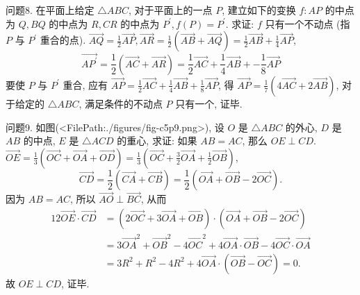 问题8. 在平面上给定 $\triangle A B C$, 对于平面上的一点 $P$, 建立如下的变换 $f: A P$ 的中点为 $Q, B Q$ 的中点为 $R, C R$ 的中点为 $P^{\prime}, f(P)=P^{\prime}$. 求证: $f$ 只有一个不动点 (指 $P$ 与 $P^{\prime}$ 重合的点).
$\overrightarrow{A Q}=\frac{1}{2} \overrightarrow{A P}, \overrightarrow{A R}=\frac{1}{2}(\overrightarrow{A B}+\overrightarrow{A Q})=\frac{1}{2} \overrightarrow{A B}+\frac{1}{4} \overrightarrow{A P}$,
$$
\overrightarrow{A P^{\prime}}=\frac{1}{2}(\overrightarrow{A C}+\overrightarrow{A R})=\frac{1}{2} \overrightarrow{A C}+\frac{1}{4} \overrightarrow{A B}+-\frac{1}{8} \overrightarrow{A P}
$$
要使 $P$ 与 $P^{\prime}$ 重合, 应有 $\overrightarrow{A P}=\frac{1}{2} \overrightarrow{A C}+\frac{1}{4} \overrightarrow{A B}+\frac{1}{8} \overrightarrow{A P}$, 得 $\overrightarrow{A P}=\frac{1}{7}(4 \overrightarrow{A C}+ 2 \overrightarrow{A B})$, 对于给定的 $\triangle A B C$, 满足条件的不动点 $P$ 只有一个, 证毕.



问题9. 如图(<FilePath:./figures/fig-c5p9.png>), 设 $O$ 是 $\triangle A B C$ 的外心, $D$ 是 $A B$ 的中点, $E$ 是 $\triangle A C D$ 的重心, 求证: 如果 $A B=A C$, 那么 $O E \perp C D$.
$\overrightarrow{O E}=\frac{1}{3}(\overrightarrow{O C}+\overrightarrow{O A}+\overrightarrow{O D})=\frac{1}{3}\left(\overrightarrow{O C}+\frac{3}{2} \overrightarrow{O A}+\frac{1}{2} \overrightarrow{O B}\right)$,
$$
\overrightarrow{C D}=\frac{1}{2}(\overrightarrow{C A}+\overrightarrow{C B})=\frac{1}{2}(\overrightarrow{O A}+\overrightarrow{O B}-2 \overrightarrow{O C}) .
$$
因为 $A B=A C$, 所以 $\overrightarrow{A O} \perp \overrightarrow{B C}$, 从而
$$
\begin{aligned}
12 \overrightarrow{O E} \cdot \overrightarrow{C D} & =(2 \overrightarrow{O C}+3 \overrightarrow{O A}+\overrightarrow{O B}) \cdot(\overrightarrow{O A}+\overrightarrow{O B}-2 \overrightarrow{O C}) \\
& =3 \overrightarrow{O A}^2+\overrightarrow{O B}^2-4 \overrightarrow{O C}^2+4 \overrightarrow{O A} \cdot \overrightarrow{O B}-4 \overrightarrow{O C} \cdot \overrightarrow{O A} \\
& =3 R^2+R^2-4 R^2+4 \overrightarrow{O A} \cdot(\overrightarrow{O B}-\overrightarrow{O C})=0 .
\end{aligned}
$$
故 $O E \perp C D$, 证毕.



